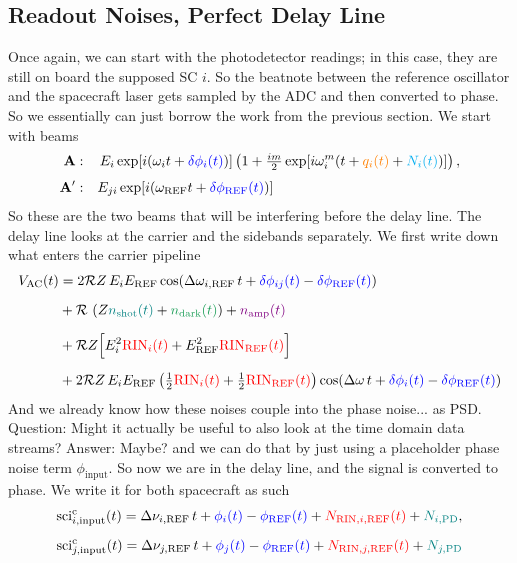 \documentclass[11pt]{article}
\begin{document}
\subsection{Readout Noises, Perfect Delay Line}
Once again, we can start with the photodetector readings; in this case, they are still on board the supposed SC $i$. So the beatnote between the reference oscillator and the spacecraft laser gets sampled by the ADC and then converted to phase. So we essentially can just borrow the work from the previous section. We start with beams
\begin{align}
\mathbf{A}:&\quad\,E_{i}\exp[i(\omega_{i} t + {\color{blue}\delta\phi_{i}(t)})]
  \left(1 + \tfrac{im}{2}\exp[i\omega_{i}^m (t + {\color{orange}q_{i}(t)} + {\color{cyan}N_{i}(t)})]\right),
  \label{eq:fieldA}\\[4pt]
\mathbf{A'}:&\quad
 E_{ji}\exp[i(\omega_{\text{REF}}t + {\color{blue}\delta\phi_{\text{REF}
 }(t)})]
\end{align}
So these are the two beams that will be interfering before the delay line. The delay line looks at the carrier and the sidebands separately. We first write down what enters the carrier pipeline
\begin{align*}
    V_\text{AC}(t) &= 2\mathcal{R} Z \, E_{i} E_{\text{REF}}
    \cos(\Delta\omega_{i,\text{REF}}\, t + {\color{blue}\delta\phi_{ij}(t)} - {\color{blue}\delta\phi_{\text{REF}}(t)})\\[6pt]
    &+ \mathcal{R}  \,\left(Z{\color{teal}n_\text{shot}(t)}+{\color{ForestGreen}n_\text{dark}(t)}\right) + {\color{violet}n_\text{amp}(t)}\\[6pt]
    &+ \mathcal{R}Z\Big[E_{i}^2{\color{red}\text{RIN}_{i}(t)} + E_{\text{REF}}^2{\color{red}\text{RIN}_{\text{REF}}(t)}\Big]\\[6pt]
    &+ 2\mathcal{R} Z \, E_{i} E_{\text{REF}}
    \left(\tfrac{1}{2}{\color{red}\text{RIN}_{i}(t)} + \tfrac{1}{2}{\color{red}\text{RIN}_{\text{REF}}(t)}\right)
    \cos(\Delta\omega\, t + {\color{blue}\delta\phi_{i}(t)} - {\color{blue}\delta\phi_{\text{REF}}(t)})
\end{align*}
And we already know how these noises couple into the phase noise... as PSD. Question: Might it actually be useful to also look at the time domain data streams? Answer: Maybe? and we can do that by just using a placeholder phase noise term $\phi_{\text{input}}$. So now we are in the delay line, and the signal is converted to phase. We write it for both spacecraft as such
\begin{align*}
    \text{sci}_{i,\text{input}}^\text{c}(t) = \Delta\nu_{i,\text{REF}}\, t + {\color{blue}\phi_{i}(t)}-{\color{blue}\phi_{\text{REF}}(t)} + {\color{red}N_{\text{RIN}, i,\text{REF}}(t)}+ {\color{teal}N_{i,\text{PD}}},\\[5pt]
    \text{sci}_{j,\text{input}}^\text{c}(t) = \Delta\nu_{j,\text{REF}}\, t + {\color{blue}\phi_{j}(t)}-{\color{blue}\phi_{\text{REF}}(t)} + {\color{red}N_{\text{RIN}, j,\text{REF}}(t)}+ {\color{teal}N_{j,\text{PD}}}
\end{align*}
\end{document}
